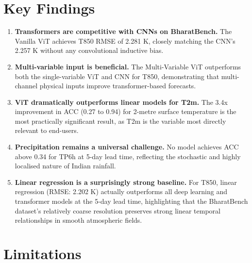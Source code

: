 \documentclass[12pt,a4paper,oneside]{report}
\begin{document}
\section{Key Findings}

\begin{enumerate}
    \item \textbf{Transformers are competitive with CNNs on BharatBench.} The Vanilla ViT achieves T850 RMSE of 2.281 K, closely matching the CNN's 2.257 K without any convolutional inductive bias.
    
    \item \textbf{Multi-variable input is beneficial.} The Multi-Variable ViT outperforms both the single-variable ViT and CNN for T850, demonstrating that multi-channel physical inputs improve transformer-based forecasts.
    
    \item \textbf{ViT dramatically outperforms linear models for T2m.} The 3.4x improvement in ACC (0.27 to 0.94) for 2-metre surface temperature is the most practically significant result, as T2m is the variable most directly relevant to end-users.
    
    \item \textbf{Precipitation remains a universal challenge.} No model achieves ACC above 0.34 for TP6h at 5-day lead time, reflecting the stochastic and highly localised nature of Indian rainfall.
    
    \item \textbf{Linear regression is a surprisingly strong baseline.} For T850, linear regression (RMSE: 2.202 K) actually outperforms all deep learning and transformer models at the 5-day lead time, highlighting that the BharatBench dataset's relatively coarse resolution preserves strong linear temporal relationships in smooth atmospheric fields.
\end{enumerate}

\section{Limitations}
\end{document}
